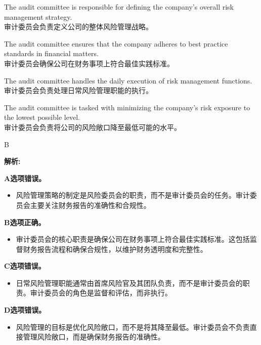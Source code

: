 \documentclass{article}
\newenvironment{explanation}
{\textbf{解析:}\par}
{\par}
\begin{document}
\begin{choices}
    \item The audit committee is responsible for defining the company's overall risk management strategy.\\
    审计委员会负责定义公司的整体风险管理战略。
    \item The audit committee ensures that the company adheres to best practice standards in financial matters.\\
    审计委员会确保公司在财务事项上符合最佳实践标准。
    \item The audit committee handles the daily execution of risk management functions.\\
    审计委员会负责处理日常风险管理职能的执行。
    \item The audit committee is tasked with minimizing the company's risk exposure to the lowest possible level.\\
    审计委员会负责将公司的风险敞口降至最低可能的水平。
\end{choices}

\begin{correctanswer}
    B
\end{correctanswer}

\begin{explanation}
    \textbf{A选项错误。}
    \begin{itemize}
        \item 风险管理策略的制定是风险委员会的职责，而不是审计委员会的任务。审计委员会主要关注财务报告的准确性和合规性。
    \end{itemize}
    
    \textbf{B选项正确。}
    \begin{itemize}
        \item 审计委员会的核心职责是确保公司在财务事项上符合最佳实践标准。这包括监督财务报告流程和确保合规性，以维护财务透明度和完整性。
    \end{itemize}
    
    \textbf{C选项错误。}
    \begin{itemize}
        \item 日常风险管理职能通常由首席风险官及其团队负责，而不是审计委员会的职责。审计委员会的角色是监督和评估，而非执行。
    \end{itemize}
    
    \textbf{D选项错误。}
    \begin{itemize}
        \item 风险管理的目标是优化风险敞口，而不是将其降至最低。审计委员会不负责直接管理风险敞口，而是确保财务报告的准确性。
    \end{itemize}
\end{explanation}
\end{document}
